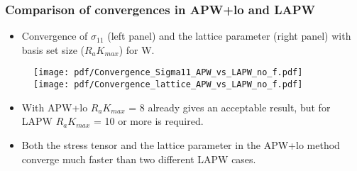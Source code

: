 \documentclass[10pt, handout]{beamer}
\newcommand{\nologo}{\setbeamertemplate{logo}{}}  %
\begin{document}
{\nologo	
\begin{frame}
	\frametitle{Comparison of convergences in APW+lo and LAPW}	
	    \begin{itemize}
	    	\item Convergence of $\sigma_{11}$ (left panel) and the lattice parameter (right panel) with basis set size ($R_aK_{max}$) for W.
	    \end{itemize}			
		\begin{figure}
			\texttt{[image: pdf/Convergence\_Sigma11\_APW\_vs\_LAPW\_no\_f.pdf]} \hfil
			\texttt{[image: pdf/Convergence\_lattice\_APW\_vs\_LAPW\_no\_f.pdf]} 
		\end{figure}
	    \begin{small}
	    	\begin{itemize}
	    		\item With APW+lo $R_aK_{max}$ = 8 already gives an acceptable result, but for LAPW $R_aK_{max}$ = 10 or more is required.
	    		\item Both the stress tensor and the lattice parameter in the APW+lo method converge much faster than two different LAPW cases.
	    	\end{itemize}
	    \end{small}
\end{frame}		
}		
		
\end{document}
